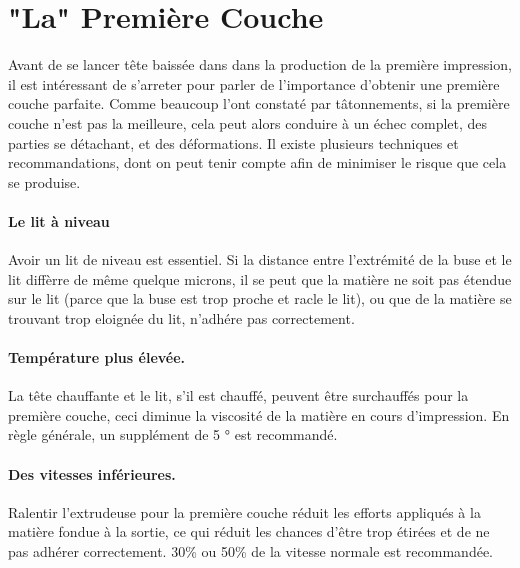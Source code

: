 
\section{"La" Première Couche}
\label{sec:the_important_first_layer}

Avant de se lancer tête baissée dans dans la production de la première impression, il est intéressant de s'arreter pour parler de l'importance d'obtenir une première couche parfaite. Comme beaucoup l'ont constaté par tâtonnements, si la première couche n'est pas la meilleure, cela peut alors conduire à un échec complet, des parties se détachant, et des déformations. Il existe plusieurs techniques et recommandations, dont on peut tenir compte afin de minimiser le risque que cela se produise.

\paragraph{Le lit à niveau} %
\label{par:level_bed}
Avoir un lit de niveau est essentiel. Si la distance entre l'extrémité de la buse et le lit diffèrre de même quelque microns, il se peut que la matière ne soit pas étendue sur le lit (parce que la buse est trop proche et racle le lit), ou que de la matière se trouvant trop eloignée du lit, n'adhére pas correctement.

\paragraph{Température plus élevée.} %
\label{par:higher_temperature}
La tête chauffante et le lit, s'il est chauffé, peuvent être surchauffés pour la première couche, ceci diminue la viscosité de la matière en cours d'impression.  En règle générale, un supplément de 5 ° est recommandé.

\paragraph{Des vitesses inférieures.} %
\label{par:lower_speeds}
Ralentir l'extrudeuse pour la première couche réduit les efforts appliqués à la matière fondue à la sortie, ce qui réduit les chances d'être trop étirées et de ne pas adhérer correctement. 30\% ou 50\% de la vitesse normale est recommandée.

